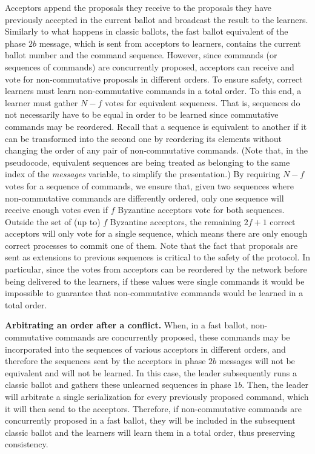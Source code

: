 Acceptors append the proposals they receive to the proposals they have previously accepted in the current ballot and broadcast the result to the learners. Similarly to what happens in classic ballots, the fast ballot equivalent of the phase $2b$ message, which is sent from acceptors to learners, contains the current ballot number and the command sequence. However, since commands (or sequences of commands) are concurrently proposed, acceptors can receive and vote for non-commutative proposals in different orders. To ensure safety, correct learners must learn non-commutative commands in a total order. To this end, a learner must gather $N-f$ votes for equivalent sequences. That is, sequences do not necessarily have to be equal in order to be learned since commutative commands may be reordered. Recall that a sequence is equivalent to another if it can be transformed into the second one by reordering its elements without changing the order of any pair of non-commutative commands. (Note that, in the pseudocode, equivalent sequences are being treated as belonging to the same index of the \emph{messages} variable, to simplify the presentation.) By requiring $N-f$ votes for a sequence of commands, we ensure that, given two sequences where non-commutative commands are differently ordered, only one sequence will receive enough votes even if $f$ Byzantine acceptors vote for both sequences. Outside the set of (up to) $f$ Byzantine acceptors, the remaining $2f+1$ correct acceptors will only vote for a single sequence, which means there are only enough correct processes to commit one of them. Note that the fact that proposals are sent as extensions to previous sequences is critical to the safety of the protocol. In particular, since the votes from acceptors can be reordered by the network before being delivered to the learners, if these values were single commands it would be impossible to guarantee that non-commutative commands would be learned in a total order. \par
\noindent \textbf{Arbitrating an order after a conflict.} When, in a fast ballot, non-commutative commands are  concurrently proposed, these commands may be incorporated into the sequences of various acceptors in different orders, and therefore the sequences sent by the acceptors in phase $2b$ messages will not be equivalent and will not be learned. In this case, the leader subsequently runs a classic ballot and gathers these unlearned sequences in phase $1b$. Then, the leader will arbitrate a single serialization for every previously proposed command, which it will then send to the acceptors. Therefore, if non-commutative commands are concurrently proposed in a fast ballot, they will be included in the subsequent classic ballot and the learners will learn them in a total order, thus preserving consistency.
